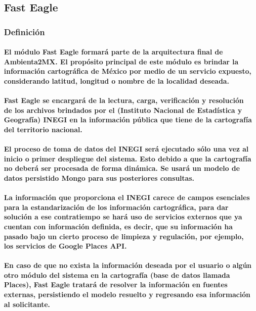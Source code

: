 \subsection{Fast Eagle}
    \subsubsection{Definición}
      \paragraph{El módulo Fast Eagle formará parte de la arquitectura final de Ambienta2MX. El propósito principal de este módulo es brindar la información cartográfica de México por medio de un servicio expuesto, considerando latitud, longitud o nombre de la localidad deseada.}
      \paragraph{Fast Eagle se encargará de la lectura, carga, verificación y resolución de los archivos brindados por el (Instituto Nacional de Estadística y Geografía) INEGI en la información pública que tiene de la cartografía del territorio nacional.}
      \paragraph{El proceso de toma de datos del INEGI será ejecutado sólo una vez al inicio o primer despliegue del sistema. Esto debido a que la cartografía no deberá ser procesada de forma dinámica. Se usará un modelo de datos persistido Mongo para sus posteriores consultas.}
      \paragraph{La información que proporciona el INEGI carece de campos esenciales para la estandarización de los información cartográfica, para dar solución a ese contratiempo se hará uso de servicios externos que ya cuentan con información definida, es decir, que su información ha pasado bajo un cierto proceso de limpieza y regulación, por ejemplo, los servicios de Google Places API.}
      \paragraph{En caso de que no exista la información deseada por el usuario o algún otro módulo del sistema en la cartografía (base de datos llamada Places), Fast Eagle tratará de resolver la información en fuentes externas, persistiendo el modelo resuelto y regresando esa información al solicitante.}
